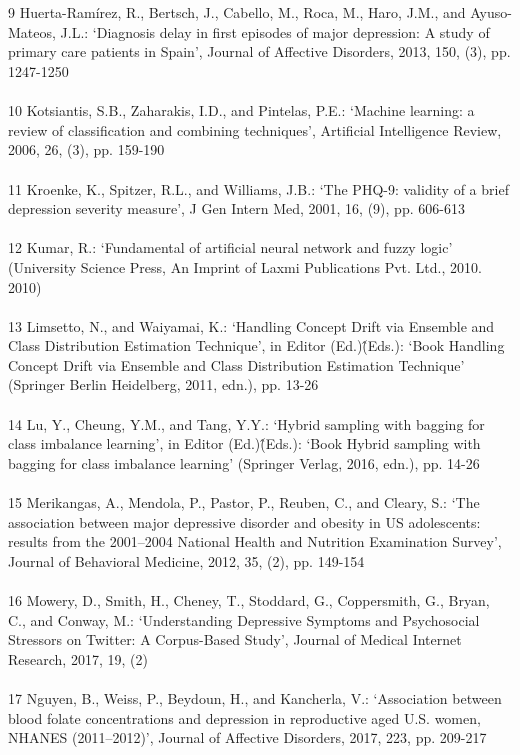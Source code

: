 \documentclass[runningheads]{llncs}
\begin{document}
\begin{thebibliography}{8}
\\\\
9	Huerta-Ramírez, R., Bertsch, J., Cabello, M., Roca, M., Haro, J.M., and Ayuso-Mateos, J.L.: ‘Diagnosis delay in first episodes of major depression: A study of primary care patients in Spain’, Journal of Affective Disorders, 2013, 150, (3), pp. 1247-1250
\\\\
10	Kotsiantis, S.B., Zaharakis, I.D., and Pintelas, P.E.: ‘Machine learning: a review of classification and combining techniques’, Artificial Intelligence Review, 2006, 26, (3), pp. 159-190
\\\\
11	Kroenke, K., Spitzer, R.L., and Williams, J.B.: ‘The PHQ-9: validity of a brief depression severity measure’, J Gen Intern Med, 2001, 16, (9), pp. 606-613
\\\\
12	Kumar, R.: ‘Fundamental of artificial neural network and fuzzy logic’ (University Science Press, An Imprint of Laxmi Publications Pvt. Ltd., 2010. 2010)
\\\\
13	Limsetto, N., and Waiyamai, K.: ‘Handling Concept Drift via Ensemble and Class Distribution Estimation Technique’, in Editor (Ed.)\^(Eds.): ‘Book Handling Concept Drift via Ensemble and Class Distribution Estimation Technique’ (Springer Berlin Heidelberg, 2011, edn.), pp. 13-26
\\\\
14	Lu, Y., Cheung, Y.M., and Tang, Y.Y.: ‘Hybrid sampling with bagging for class imbalance learning’, in Editor (Ed.)\^(Eds.): ‘Book Hybrid sampling with bagging for class imbalance learning’ (Springer Verlag, 2016, edn.), pp. 14-26
\\\\
15	Merikangas, A., Mendola, P., Pastor, P., Reuben, C., and Cleary, S.: ‘The association between major depressive disorder and obesity in US adolescents: results from the 2001–2004 National Health and Nutrition Examination Survey’, Journal of Behavioral Medicine, 2012, 35, (2), pp. 149-154
\\\\
16	Mowery, D., Smith, H., Cheney, T., Stoddard, G., Coppersmith, G., Bryan, C., and Conway, M.: ‘Understanding Depressive Symptoms and Psychosocial Stressors on Twitter: A Corpus-Based Study’, Journal of Medical Internet Research, 2017, 19, (2)
\\\\
17	Nguyen, B., Weiss, P., Beydoun, H., and Kancherla, V.: ‘Association between blood folate concentrations and depression in reproductive aged U.S. women, NHANES (2011–2012)’, Journal of Affective Disorders, 2017, 223, pp. 209-217

\end{thebibliography}
\end{document}
